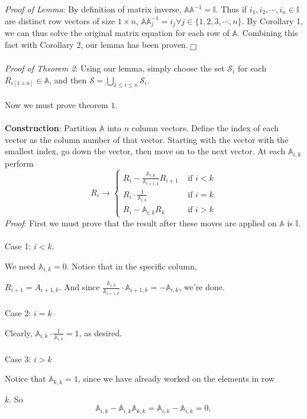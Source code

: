 \documentclass{article}
\begin{document}
\textit{Proof of Lemma}: By definition of matrix inverse, $\mathbb{A} \mathbb{A}^{-1}=\mathbb{I}$. Thus if $i_1, i_2, \cdots, i_n\in \mathbb{I}$ are distinct row vectors of size $1\times n$, $\mathbb{A}\mathbb{A}_j^{-1}=i_j\forall j\in \{1,2,3,\cdots, n\}$. By Corollary 1, we can thus solve the original matrix equation for each row of $\mathbb{A}$. Combining this fact with Corollary 2, our lemma has been proven. $\fbox{}$  \\ \\
\textit{Proof of Theorem 2}: Using our lemma, simply choose the set $\mathcal{S}_i$ for each $R_{i[1\times n]}\in \mathbb{A}$, and then $\mathcal{S}=\bigcup_{1\le i\le n} \mathcal{S}_i$.
\\ \\
Now we must prove theorem $1$. \\ \\
\textbf{Construction}:
Partition $\mathbb{A}$ into $n$ column vectors. Define the index of each vector as the column number of that vector. Starting with the vector with the smallest index, go down the vector, then move on to the next vector. At each $\mathbb{A}_{i,k}$ perform
 $$R_i\to \begin{cases} 
      R_i-\frac{\mathbb{A}_{i,k}}{\mathbb{A}_{i+1,k}}R_{i+1} & \text{ if }i<k \\
      R_i\cdot \frac{1}{
      \mathbb{A}_{i,k}}& \text{ if } i=k \\
      R_i-\mathbb{A}_{i,k}R_k & \text{ if } i>k
   \end{cases}$$ 
\textit{Proof}:
First we must prove that the result after these moves are applied on $\mathbb{A}$ is $\mathbb{I}$. \\ \\
Case 1: $i<k$.
\par We need $\mathbb{A}_{i,k}=0$. Notice that in the specific column, \par $R_{i+1}=A_{i+1, k}$. And since $\frac{\mathbb{A}_{i,k}}{\mathbb{A}_{i+1,k}}\cdot\mathbb{A}_{i+1,k}=-\mathbb{A}_{i,k}$, we're done. 
\\ \\ Case 2: $i=k$
\par Clearly, $\mathbb{A}_{i,k}\cdot \frac{1}{\mathbb{A}_{i,k}}=1$, as desired.
\\ \\ Case 3: $i>k$
\par Notice that $\mathbb{A}_{k,k}=1$, since we have already worked on the elements in row \par $k$. So $$\mathbb{A}_{i,k}-\mathbb{A}_{i,k}\mathbb{A}_{k,k}=\mathbb{A}_{i,k}-\mathbb{A}_{i,k}=0,$$
\end{document}
